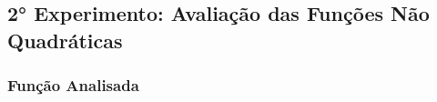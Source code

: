 \subsection{2° Experimento: Avaliação das Funções Não Quadráticas}
    \subsubsection{Função Analisada}